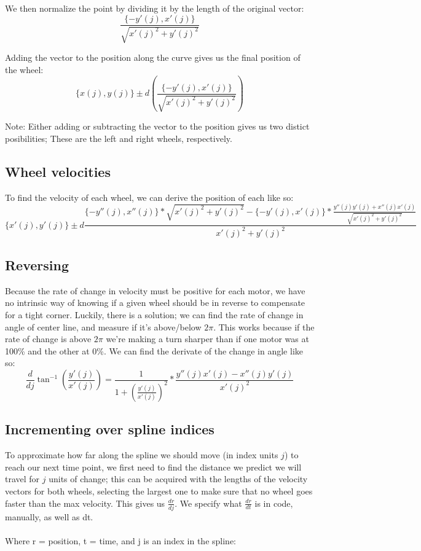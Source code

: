 \documentclass[12pt, english]{article}
\begin{document}
\noindent
We then normalize the point by dividing it by the length of the original vector: \\
\begin{equation}
	\label{deriv_speed_vec}
	\frac{\{-y'(j), x'(j)\}}{\sqrt{x'(j)^2+y'(j)^2}}
\end{equation}

\noindent
Adding the vector to the position along the curve gives us the final position of the wheel:
\begin{equation}
	\{x(j), y(j)\} \pm d \left(\frac{\{-y'(j), x'(j)\}}{\sqrt{x'(j)^2+y'(j)^2}}\right)
\end{equation}

\noindent
Note: Either adding or subtracting  the vector to the position gives us two distict posibilities; These are the left and right wheels, respectively.

\subsection{Wheel velocities}
To find the velocity of each wheel, we can derive the position of each like so:
\begin{equation}
	\{x'(j), y'(j)\} \pm d\frac{\{-y''(j), x''(j)\}*\sqrt{x'(j)^2+y'(j)^2} - \{-y'(j), x'(j)\} * \frac{y''(j)y'(j) + x''(j)x'(j)}{\sqrt{x'(j)^2+y'(j)^2}}}{x'(j)^2+y'(j)^2}
\end{equation}

\subsection{Reversing}
Because the rate of change in velocity must be positive for each motor, we have no intrinsic way of knowing if a given wheel should be in reverse to compensate for a tight corner. Luckily, there is a solution; we can find the rate of change in angle of center line, and measure if it's above/below $2\pi$. This works because if the rate of change is above $2\pi$ we're making a turn sharper than if one motor was at 100\% and the other at 0\%. We can find the derivate of the change in angle like so:
\begin{equation}
	\label{change_in_angle}
	\frac{d}{dj} 
	\tan^{-1}{\left(\frac{y'(j)}{x'(j)}\right)} = 
	\frac{1}{1 + \left(\frac{y'(j)}{x'(j)}\right)^2} * \frac{y''(j)x'(j) - x''(j)y'(j)}{x'(j)^2}
\end{equation}


\subsection{Incrementing over spline indices}
To approximate how far along the spline we should move (in index units $j$) to reach our next time point, we first need to find the distance we predict we will travel for $j$ units of change; this can be acquired with the lengths of the velocity vectors for both wheels, selecting the largest one to make sure that no wheel goes faster than the max velocity. This gives us $\frac{dr}{dj}$. We specify what $\frac{dr}{dt}$ is in code, manually, as well as dt. \\
\\
\noindent
Where r = position, t = time, and j is an index in the spline:
\end{document}

